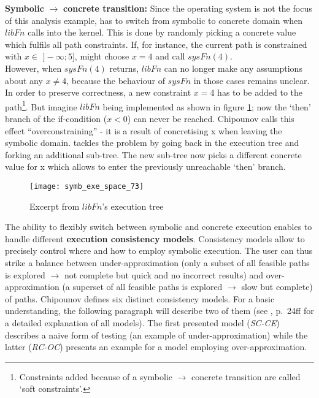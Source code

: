 \medskip
\textbf{Symbolic} $\rightarrow$ \textbf{concrete transition:}
Since the operating system is not the focus of this analysis example, \sse has to switch from symbolic to concrete domain when $libFn$ calls into the kernel.
This is done by randomly picking a concrete value which fulfils all path constraints.
If, for instance, the current path is constrained with $x \in$ $]-\infty;5]$, \sse might choose $x=4$ and call $sysFn(4)$.\\
However, when $sysFn(4)$ returns, $libFn$ can no longer make any assumptions about any $x \neq 4$, because the behaviour of $sysFn$ in those cases remains unclear.
In order to preserve correctness, a new constraint $x = 4$ has to be added to the path\footnote{Constraints added because of a symbolic $\rightarrow$ concrete transition are called `soft constraints'.}.
But imagine $libFn$ being implemented as shown in figure \ref{fig:ssetree2}; now the `then' branch of the if-condition ($x < 0$) can never be reached.
Chipounov calls this effect ``overconstraining'' \cite{chip14s2e} - it is a result of concretising x when leaving the symbolic domain.
\sse tackles the problem by going back in the execution tree and forking an additional sub-tree.
The new sub-tree now picks a different concrete value for x which allows to enter the previously unreachable `then' branch.

\begin{figure}
\texttt{[image: symb\_exe\_space\_73]}
\caption{Excerpt from $libFn$'s execution tree \cite{chip12s2e}}
\label{fig:ssetree2}
\end{figure}


\medskip
The ability to flexibly switch between symbolic and concrete execution enables \sse to handle different \textbf{execution consistency models}.
Consistency models allow to precisely control where and how to employ symbolic execution.
The user can thus strike a balance between under-approximation (only a subset of all feasible paths is explored $\rightarrow$ not complete but quick and no incorrect results) and over-approximation (a superset of all feasible paths is explored $\rightarrow$ slow but complete) of paths.
Chipounov defines six distinct consistency models.
For a basic understanding, the following paragraph will describe two of them (see \cite{chip14s2e}, p.~24ff for a detailed explanation of all models).
The first presented model (\textit{SC-CE}) describes a naive form of testing (an example of under-approximation) while the latter (\textit{RC-OC}) presents an example for a model employing over-approximation.

